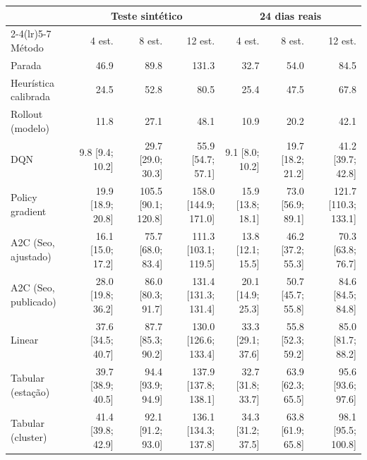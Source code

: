 \begin{tabular}{lrrrrrr}
\toprule
& \multicolumn{3}{c}{Teste sintético} & \multicolumn{3}{c}{24 dias reais} \\
\cmidrule(lr){2-4}\cmidrule(lr){5-7}
Método & 4 est. & 8 est. & 12 est. & 4 est. & 8 est. & 12 est. \\
\midrule
Parada & 46.9 & 89.8 & 131.3 & 32.7 & 54.0 & 84.5 \\
Heurística calibrada & 24.5 & 52.8 & 80.5 & 25.4 & 47.5 & 67.8 \\
Rollout (modelo) & 11.8 & 27.1 & 48.1 & 10.9 & 20.2 & 42.1 \\
DQN & 9.8 [9.4; 10.2] & 29.7 [29.0; 30.3] & 55.9 [54.7; 57.1] & 9.1 [8.0; 10.2] & 19.7 [18.2; 21.2] & 41.2 [39.7; 42.8] \\
Policy gradient & 19.9 [18.9; 20.8] & 105.5 [90.1; 120.8] & 158.0 [144.9; 171.0] & 15.9 [13.8; 18.1] & 73.0 [56.9; 89.1] & 121.7 [110.3; 133.1] \\
A2C (Seo, ajustado) & 16.1 [15.0; 17.2] & 75.7 [68.0; 83.4] & 111.3 [103.1; 119.5] & 13.8 [12.1; 15.5] & 46.2 [37.2; 55.3] & 70.3 [63.8; 76.7] \\
A2C (Seo, publicado) & 28.0 [19.8; 36.2] & 86.0 [80.3; 91.7] & 131.4 [131.3; 131.4] & 20.1 [14.9; 25.3] & 50.7 [45.7; 55.8] & 84.6 [84.5; 84.8] \\
Linear & 37.6 [34.5; 40.7] & 87.7 [85.3; 90.2] & 130.0 [126.6; 133.4] & 33.3 [29.1; 37.6] & 55.8 [52.3; 59.2] & 85.0 [81.7; 88.2] \\
Tabular (estação) & 39.7 [38.9; 40.5] & 94.4 [93.9; 94.9] & 137.9 [137.8; 138.1] & 32.7 [31.8; 33.7] & 63.9 [62.3; 65.5] & 95.6 [93.6; 97.6] \\
Tabular (cluster) & 41.4 [39.8; 42.9] & 92.1 [91.2; 93.0] & 136.1 [134.3; 137.8] & 34.3 [31.2; 37.5] & 63.8 [61.9; 65.8] & 98.1 [95.5; 100.8] \\
\bottomrule
\end{tabular}
